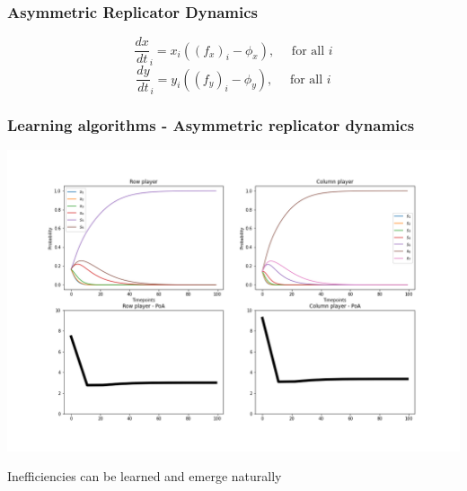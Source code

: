 \begin{frame}
    \frametitle{Asymmetric Replicator Dynamics}
    \centering

    \[
        \frac{dx}{dt}_i = x_i((f_x)_i - \phi_x), \quad \text{ for all }i
    \]
    \[
        \frac{dy}{dt}_i = y_i((f_y)_i - \phi_y), \quad \text{ for all }i
    \]
    
\end{frame}





\begin{frame}
    \frametitle{Learning algorithms - Asymmetric replicator dynamics}

    \includegraphics[scale=0.28]{Bin/replicator_dynamics/ARD_game.png}
\end{frame}

\begin{frame}
    \centering
    \Huge{
    Inefficiencies can be learned and emerge naturally
    }
\end{frame}


